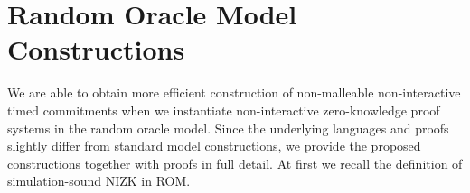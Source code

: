 \section{Random Oracle Model Constructions}
We are able to obtain more efficient construction of non-malleable non-interactive timed commitments when we instantiate non-interactive zero-knowledge proof systems in the random oracle model. Since the underlying languages and proofs slightly differ from standard model constructions, we provide the proposed constructions together with proofs in full detail. At first we recall the definition of simulation-sound NIZK in ROM. 




